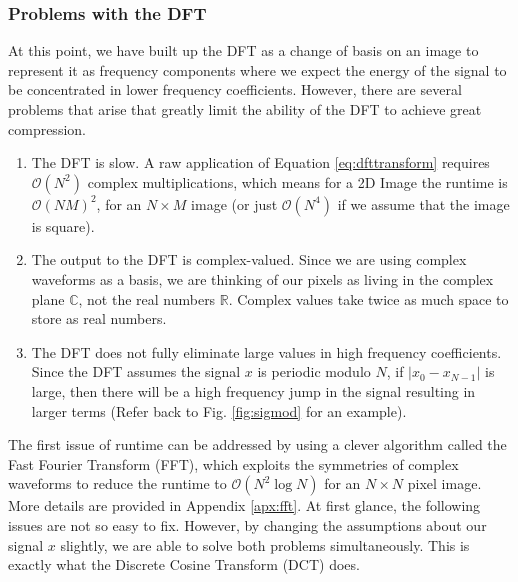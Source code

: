 \subsubsection{Problems with the DFT}
At this point, we have built up the DFT as a change of basis on an image to represent it as frequency components where we expect the energy of the signal to be concentrated in lower frequency coefficients. However, there are several problems that arise that greatly limit the ability of the DFT to achieve great compression.
\begin{enumerate}
    \item The DFT is slow. A raw application of Equation \ref{eq:dfttransform} requires $\mathcal{O}(N^2)$ complex multiplications, which means for a 2D Image the runtime is $\mathcal{O}(NM)^2$, for an $N\times M$ image (or just $\mathcal{O}(N^4)$ if we assume that the image is square).
    \item The output to the DFT is complex-valued. Since we are using complex waveforms as a basis, we are thinking of our pixels as living in the complex plane $\mathbb{C}$, not the real numbers $\mathbb{R}$. Complex values take twice as much space to store as real numbers.
    \item The DFT does not fully eliminate large values in high frequency coefficients. Since the DFT assumes the signal $x$ is periodic modulo $N$, if $|x_0-x_{N-1}|$ is large, then there will be a high frequency jump in the signal resulting in larger terms (Refer back to Fig. \ref{fig:sigmod} for an example). 
\end{enumerate}
The first issue of runtime can be addressed by using a clever algorithm called the Fast Fourier Transform (FFT), which exploits the symmetries of complex waveforms to reduce the runtime to $\mathcal{O}(N^2\log N)$ for an $N\times N$ pixel image. More details are provided in Appendix \ref{apx:fft}. At first glance, the following issues are not so easy to fix. However, by changing the assumptions about our signal $x$ slightly, we are able to solve both problems simultaneously. This is exactly what the Discrete Cosine Transform (DCT) does.

